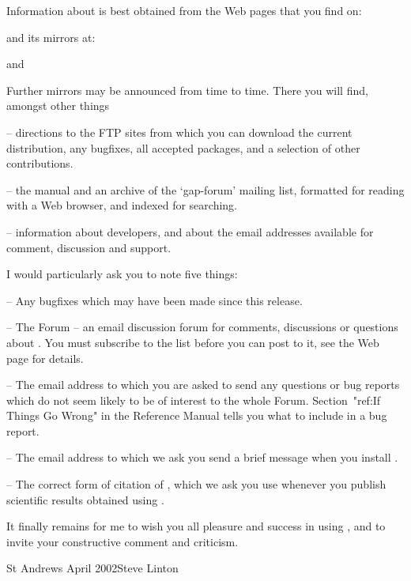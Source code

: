 
Information about {\GAP} is best obtained from the {\GAP} Web pages that
you find on:


and its mirrors at:

 and



Further mirrors may be announced from time to time. There you will
find, amongst other things
\beginlist%
\item{--} directions to the FTP sites from which you can download the
current {\GAP} distribution, any bugfixes, all accepted {\GAP} packages,
and a selection of other contributions.
\item{--} the {\GAP} manual and an archive of the `gap-forum' mailing
list, formatted for reading with a Web browser, and indexed for
searching.
\item{--} information about {\GAP} developers, and about the email
addresses available for comment, discussion and support.
\endlist


I would particularly ask you to note five things:
\beginlist%
\item{--} Any bugfixes which may have been made since this release.
\item{--} The  {\GAP} Forum -- an email discussion forum for comments,
discussions or questions about {\GAP}. You must subscribe to the list
before you can post to it, see the Web page for details.
\item{--} The email address  to which you
are asked to send any questions or bug reports which do not seem likely
to be of interest to the whole {\GAP} Forum. Section~"ref:If Things Go Wrong"
in the Reference Manual tells you what to include in a bug report.
\item{--} The email address  to which we ask you
send a brief message when you install {\GAP}.
\item{--} The correct form of citation of {\GAP}, which we ask you use
whenever you publish scientific results obtained using {\GAP}.
\endlist



It finally remains  for me to wish you  all pleasure and success in using
{\GAP}, and to invite your constructive comment and criticism.

St Andrews April 2002\hfill Steve Linton



